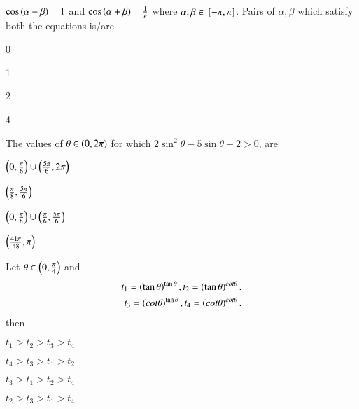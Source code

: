 \item $\cos\left(\alpha - \beta\right)=1$ and $\cos\left(\alpha + \beta\right)=\frac{1}{e}$ where $\alpha, \beta \in {}\left[-\pi,\pi\right]$. Pairs of $\alpha, \beta$ which satisfy both the equations is/are
\hfill{}
\begin{enumerate}
\begin{multicols}{2}
\item 0
\columnbreak
\item 1
\end{multicols}
\begin{multicols}{2}
\item 2
\columnbreak
\item 4 
\end{multicols}
\end{enumerate}
\item The values of $\theta \in \left(0,2\pi\right)$ for which $2\sin^2\theta - 5\sin\theta + 2 > 0$, are
\hfill{}
\begin{enumerate}
\begin{multicols}{2}
\item $\left(0,\frac{\pi}{6}\right)\cup\left(\frac{5\pi}{6},2\pi\right)$
\columnbreak
\item $\left(\frac{\pi}{8},\frac{5\pi}{6}\right)$
\end{multicols}
\begin{multicols}{2}
\item $\left(0,\frac{\pi}{8}\right)\cup\left(\frac{\pi}{6},\frac{5\pi}{6}\right)$
\columnbreak
\item $\left(\frac{41\pi}{48},\pi\right)$
\end{multicols}
\end{enumerate}
\item Let $\theta \in \left(0,\frac{\pi}{4}\right)$ and 
\begin{align*}
t_1 = \left(\tan\theta\right)^{\tan\theta}, t_2 = \left(\tan\theta\right)^{cot\theta},\\t_3 = \left(cot\theta\right)^{\tan\theta}, t_4 = \left(cot\theta\right)^{cot\theta},
\end{align*} then
\hfill{}
\begin{enumerate}
\begin{multicols}{2}
\item $t_1>t_2>t_3>t_4$
\columnbreak
\item $t_4>t_3>t_1>t_2$
\end{multicols}
\begin{multicols}{2}
\item $t_3>t_1>t_2>t_4$
\columnbreak
\item $t_2>t_3>t_1>t_4$
\end{multicols}
\end{enumerate}

